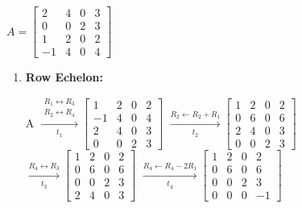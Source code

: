 $A=
\begin{bmatrix}
    2 & 4 & 0 & 3 \\
    0 & 0 & 2 & 3 \\
    1 & 2 & 0 & 2 \\
    -1 & 4 & 0 & 4
\end{bmatrix}
$ \\[1.0em]

\begin{enumerate}
\item
    \textbf{Row Echelon:} \\[1.0em]
    \begin{answer}
        A $\xrightarrow[
            t_1
        ]{
            \substack{
                R_1 \leftrightarrow R_3 \\
                R_2 \leftrightarrow R_4
            }
        }
        \begin{bmatrix}
            1 & 2 & 0 & 2 \\
            -1 & 4 & 0 & 4 \\
            2 & 4 & 0 & 3 \\
            0 & 0 & 2 & 3
        \end{bmatrix}
        $
        $ \xrightarrow[t_2]{R_2 \leftarrow R_2 + R_1}
        \begin{bmatrix}
            1 & 2 & 0 & 2 \\
            0 & 6 & 0 & 6 \\
            2 & 4 & 0 & 3 \\
            0 & 0 & 2 & 3
        \end{bmatrix}
        $  \\[0.5em]
        $ \xrightarrow[t_3]{R_4 \leftrightarrow R_3}
        \begin{bmatrix}
            1 & 2 & 0 & 2 \\
            0 & 6 & 0 & 6 \\
            0 & 0 & 2 & 3 \\
            2 & 4 & 0 & 3
        \end{bmatrix}
        $
        $ \xrightarrow[t_4]{R_4 \leftarrow R_4 - 2R_1}
        \begin{bmatrix}
            1 & 2 & 0 & 2 \\
            0 & 6 & 0 & 6 \\
            0 & 0 & 2 & 3 \\
            0 & 0 & 0 & -1
        \end{bmatrix}
        $ \\[1.0em]
    \end{answer}


\end{enumerate}
